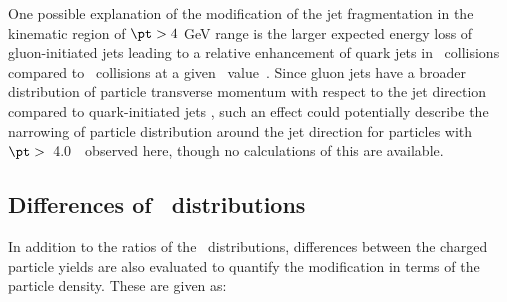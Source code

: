 One possible explanation of the modification of the 
jet fragmentation in the kinematic region of $\pt > 4$ GeV range is the larger expected energy loss
of gluon-initiated jets leading to a relative enhancement of quark jets in \pbpb\ collisions compared
to \pp\ collisions at a given \ptjet\ value~\cite{Aaboud:2018hpb, Spousta:2015fca}. Since gluon jets have a broader distribution of particle transverse momentum with respect to the jet direction compared to quark-initiated jets \cite{OPAL:1995ab}
 , such an effect could potentially describe the narrowing of particle distribution around the jet direction for particles with $\pt >$~4.0~\GeV\
observed here, though no calculations of this are available.



\FloatBarrier


\subsection{Differences of \Dptr\ distributions}
In addition to the ratios of the \Dptr\ distributions, differences between the charged particle yields are also evaluated to quantify the modification in terms of the particle density. These are given as:

